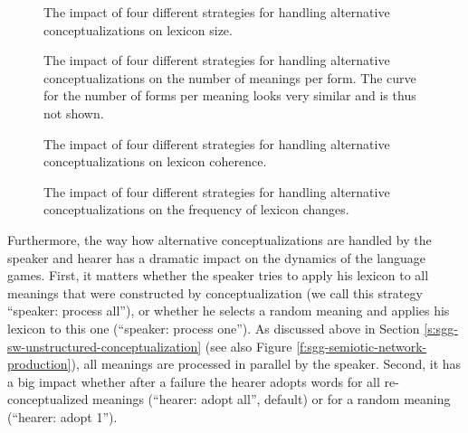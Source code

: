 \begin{figure}[t]
  \caption{The impact of four different strategies for handling
    alternative conceptualizations on lexicon size.}
  \label{f:sgg-sw-unstructured-50-attrs-conceptualization-handling-vs-lexicon-size}
\end{figure}


\begin{figure}[t]
  \caption{The impact of four different strategies for handling
    alternative conceptualizations on the number of meanings per
    form. The curve for the number of forms per meaning looks very
    similar and is thus not shown.}
  \label{f:sgg-sw-unstructured-50-attrs-conceptualization-handling-vs-homonymy}
\end{figure}

\begin{figure}[t]
  \caption{The impact of four different strategies for handling
    alternative conceptualizations on lexicon coherence.}
  \label{f:sgg-sw-unstructured-50-attrs-conceptualization-handling-vs-lexicon-coherence}
\end{figure}

\begin{figure}[t]
  \caption{The impact of four different strategies for handling
    alternative conceptualizations on the frequency of lexicon
    changes.}
  \label{f:sgg-sw-unstructured-50-attrs-conceptualization-handling-vs-lexicon-changes}
\end{figure}

\stopfiguregroup

\noindent Furthermore, the way how alternative conceptualizations are
handled by the speaker and hearer has a dramatic impact on the
dynamics of the language games. First, it matters whether the speaker
tries to apply his lexicon to all meanings that were constructed by
conceptualization (we call this strategy ``speaker: process all''), or
whether he selects a random meaning and applies his lexicon to this
one (``speaker: process one''). As discussed above in Section
\ref{s:sgg-sw-unstructured-conceptualization} (see also Figure
\ref{f:sgg-semiotic-network-production}), all meanings are processed
in parallel by the speaker. Second, it has a big impact whether after
a failure the hearer adopts words for all re-conceptualized meanings
(``hearer: adopt all'', default) or for a random meaning (``hearer:
adopt 1'').

